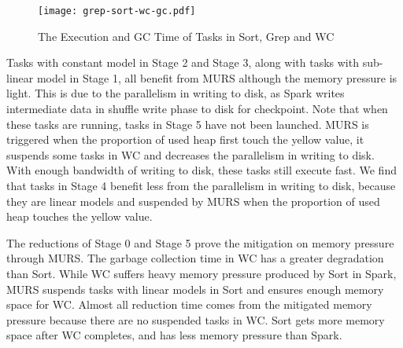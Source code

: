 
\begin{figure}[!t]
\centering
\texttt{[image: grep-sort-wc-gc.pdf]}
\caption{The Execution and GC Time of Tasks in Sort, Grep and WC}
\label{fig:grep-sort-wc-gc}
\end{figure}

Tasks with constant model in Stage 2 and Stage 3, along with tasks with sub-linear model in Stage 1, all benefit from MURS although the memory pressure is light. This is due to the parallelism in writing to disk, as Spark writes intermediate data in shuffle write phase to disk for checkpoint. Note that when these tasks are running, tasks in Stage 5 have not been launched. MURS is triggered when the proportion of used heap first touch the yellow value, it suspends some tasks in WC and decreases the parallelism in writing to disk. With enough bandwidth of writing to disk, these tasks still execute fast. We find that tasks in Stage 4 benefit less from the parallelism in writing to disk, because they are linear models and suspended by MURS when the proportion of used heap touches the yellow value. 

The reductions of Stage 0 and Stage 5 prove the mitigation on memory pressure through MURS. The garbage collection time in WC has a greater degradation than Sort. While WC suffers heavy memory pressure produced by Sort in Spark, MURS suspends tasks with linear models in Sort and ensures enough memory space for WC. Almost all reduction time comes from the mitigated memory pressure because there are no suspended tasks in WC. Sort gets more memory space after WC completes, and has less memory pressure than Spark. 


